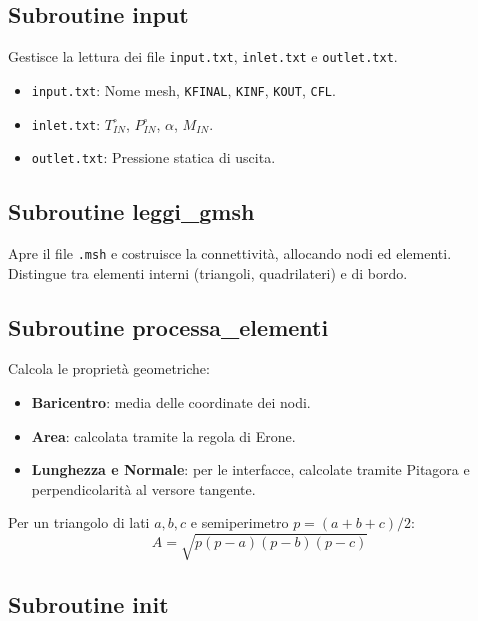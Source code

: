\subsection{Subroutine input}

Gestisce la lettura dei file \texttt{input.txt}, \texttt{inlet.txt} e \texttt{outlet.txt}.
\begin{itemize}
    \item \texttt{input.txt}: Nome mesh, \texttt{KFINAL}, \texttt{KINF}, \texttt{KOUT}, \texttt{CFL}.
    \item \texttt{inlet.txt}: $T^\circ_{IN}$, $P^\circ_{IN}$, $\alpha$, $M_{IN}$.
    \item \texttt{outlet.txt}: Pressione statica di uscita.
\end{itemize}

\subsection{Subroutine leggi\_gmsh}

Apre il file \texttt{.msh} e costruisce la connettività, allocando nodi ed elementi. Distingue tra elementi interni (triangoli, quadrilateri) e di bordo.

\subsection{Subroutine processa\_elementi}

Calcola le proprietà geometriche:
\begin{itemize}
    \item \textbf{Baricentro}: media delle coordinate dei nodi.
    \item \textbf{Area}: calcolata tramite la regola di Erone.
    \item \textbf{Lunghezza e Normale}: per le interfacce, calcolate tramite Pitagora e perpendicolarità al versore tangente.
\end{itemize}

Per un triangolo di lati $a, b, c$ e semiperimetro $p = (a+b+c)/2$:
\[ A = \sqrt{p(p-a)(p-b)(p-c)} \]

\subsection{Subroutine init}

